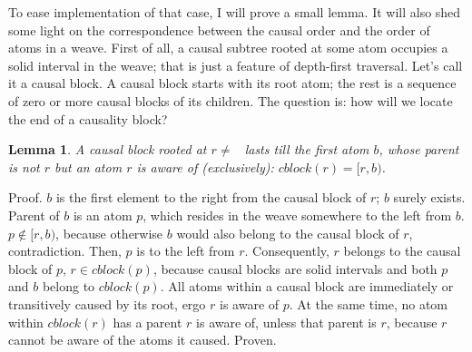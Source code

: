 \documentclass{acm_proc_article-sp}
\newtheorem{lemma}{Lemma}
\begin{document}
To ease implementation of that case, I will prove
a small lemma. It will also shed some light on the
correspondence between the causal order and the order of atoms
in a weave.
First of all, a causal subtree rooted at some atom occupies
a solid interval in the weave; that is just a feature of
depth-first traversal. Let's call it a causal block.
A causal block starts with its root atom; the rest is
a sequence of zero or more causal blocks of its children.
The question is: how will we locate the end of a causality
block?
\begin{lemma} A causal block rooted at $r \ne$ \aum ~lasts till
the first atom $b$, whose parent is not $r$ but an atom
$r$ is aware of (exclusively):  $cblock(r) = [r,b)$. \label{lemma:1}
\end{lemma} 
Proof. $b$ is the first element to the right from the causal
block of $r$; $b$ surely exists. Parent of $b$ is an atom $p$,
which resides in the weave somewhere to the left from $b$.
$p \notin [r,b)$, because otherwise $b$ would also belong
to the causal block of $r$, contradiction.
Then, $p$ is to the left from $r$. Consequently, $r$ belongs
to the causal block of $p$, $r \in cblock(p)$, because
causal blocks are solid intervals and both $p$ and $b$
belong to $cblock(p)$. All atoms within a causal block are
immediately or transitively caused by its root,
ergo $r$ is aware of $p$. At the same time, no atom
within $cblock(r)$ has a parent $r$ is aware of, unless
that parent is $r$, because $r$ cannot be aware of the
atoms it caused. Proven.
\end{document}

